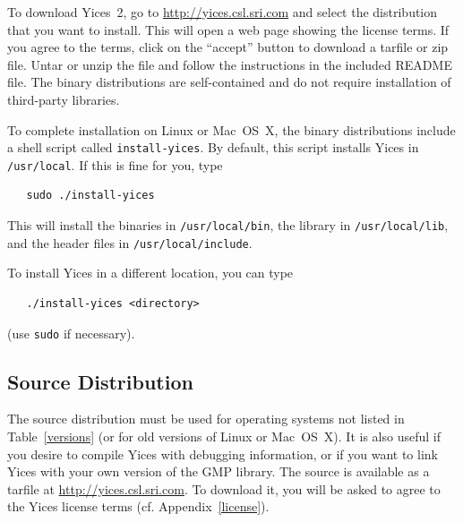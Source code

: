 \documentclass[11pt,twoside,fleqn,openright,titlepage]{cslreport}
\begin{document}
To download Yices~2, go to \url{http://yices.csl.sri.com} and select
the distribution that you want to install. This will open a web page
showing the license terms. If you agree to the terms, click on the
``accept'' button to download a tarfile or zip file.  Untar or unzip
the file and follow the instructions in the included README file.  The
binary distributions are self-contained and do not require
installation of third-party libraries.

To complete installation on Linux or Mac~OS~X, the binary
distributions include a shell script called \texttt{install-yices}. By
default, this script installs Yices in \texttt{/usr/local}. If
this is fine for you, type
\begin{small}
\begin{verbatim}
   sudo ./install-yices
\end{verbatim}
\end{small}
This will install the binaries in \texttt{/usr/local/bin}, the library
in \texttt{/usr/local/lib}, and the header files in
\texttt{/usr/local/include}. 

\medskip\noindent
To install Yices in a different location, you can type
\begin{small}
\begin{verbatim}
   ./install-yices <directory>
\end{verbatim}
\end{small}
(use \texttt{sudo} if necessary).


\subsection{Source Distribution}

The source distribution must be used for operating systems not listed
in Table~\ref{versions} (or for old versions of Linux or Mac~OS~X). It
is also useful if you desire to compile Yices with debugging
information, or if you want to link Yices with your own version of the
GMP library. The source is available as a tarfile at
\url{http://yices.csl.sri.com}. To download it, you will be asked to
agree to the Yices license terms (cf. Appendix~\ref{license}).
\end{document}
